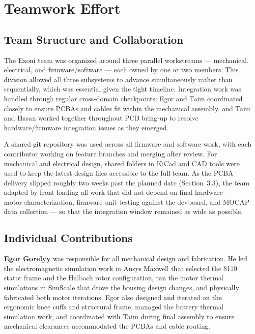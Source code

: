\documentclass[11pt]{article}
\begin{document}
\section{Teamwork Effort}

\subsection{Team Structure and Collaboration}

The Exoni team was organized around three parallel workstreams --- mechanical, electrical, and firmware/software --- each owned by one or two members. This division allowed all three subsystems to advance simultaneously rather than sequentially, which was essential given the tight timeline. Integration work was handled through regular cross-domain checkpoints: Egor and Taim coordinated closely to ensure PCBAs and cables fit within the mechanical assembly, and Taim and Hasan worked together throughout PCB bring-up to resolve hardware/firmware integration issues as they emerged.

A shared git repository was used across all firmware and software work, with each contributor working on feature branches and merging after review. For mechanical and electrical design, shared folders in KiCad and CAD tools were used to keep the latest design files accessible to the full team. As the PCBA delivery slipped roughly two weeks past the planned date (Section~3.3), the team adapted by front-loading all work that did not depend on final hardware --- motor characterization, firmware unit testing against the devboard, and MOCAP data collection --- so that the integration window remained as wide as possible.

\subsection{Individual Contributions}

\textbf{Egor Gorelyy} was responsible for all mechanical design and fabrication. He led the electromagnetic simulation work in Ansys Maxwell that selected the 8110 stator frame and the Halbach rotor configuration, ran the motor thermal simulations in SimScale that drove the housing design changes, and physically fabricated both motor iterations. Egor also designed and iterated on the ergonomic knee cuffs and structural frame, managed the battery thermal simulation work, and coordinated with Taim during final assembly to ensure mechanical clearances accommodated the PCBAs and cable routing.
\end{document}
